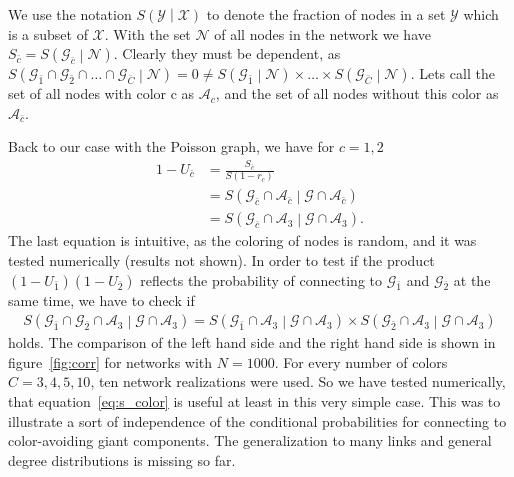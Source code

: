 \documentclass[aps, pre, onecolumn, a4paper, floatfix]{revtex4}
\begin{document}
We use the notation $S\left({\mathcal Y}\middle|{\mathcal X}\right)$ to denote 
the fraction of nodes in a set ${\mathcal Y}$ which is a subset of ${\mathcal X}$. With 
the set ${\mathcal N}$ of all nodes in the network we have 
$S_{\bar c}=S\left({\mathcal G}_{\bar c}\middle|{\mathcal N}\right)$. Clearly they must 
be dependent, as 
$S\left({\mathcal G}_{\bar 1}\cap {\mathcal G}_{\bar 2}\cap \dots 
\cap {\mathcal G}_{\bar C}\middle| {\mathcal N}\right)=0\neq 
S\left({\mathcal G}_{\bar 1}\middle| {\mathcal N}\right)\times\dots \times 
S\left({\mathcal G}_{\bar C}\middle| {\mathcal N}\right)$. 
Lets call the set of all nodes with color c as ${\mathcal A}_c$, 
and the set of all nodes without this color as ${\mathcal A}_{\bar c}$. 

Back to our case with the Poisson graph, we have for $c=1,2$
\begin{align}
1-U_{\bar c} &=\frac{S_{\bar c}}{S (1-r_c)}\\
 &= S\left({\mathcal G}_{\bar c} \cap {\mathcal A}_{\bar c} \middle| {\mathcal G} \cap {\mathcal A}_{\bar c} \right)\\
 &= S\left({\mathcal G}_{\bar c} \cap {\mathcal A}_{3} \middle| {\mathcal G} \cap {\mathcal A}_{3} \right).
\end{align}
The last equation is intuitive, as the coloring of nodes is random, and it was tested numerically (results not shown). 
In order to test if the product $(1-U_{\bar 1})(1-U_{\bar 2})$ reflects the probability of 
connecting to ${\mathcal G}_{\bar 1}$ and ${\mathcal G}_{\bar 2}$ at the same time, 
we have to check if 
\begin{align}
S\left({\mathcal G}_{\bar 1}\cap {\mathcal G}_{\bar 2} \cap {\mathcal A}_3 \middle| {\mathcal G} \cap {\mathcal A}_3 \right)=
S\left({\mathcal G}_{\bar 1} \cap {\mathcal A}_3 \middle| {\mathcal G} \cap {\mathcal A}_3 \right)\times 
S\left({\mathcal G}_{\bar 2} \cap {\mathcal A}_3 \middle| {\mathcal G} \cap {\mathcal A}_3 \right)\label{eq:independent}
\end{align}
holds. The comparison of the left hand side and the right hand side 
is shown in figure~\ref{fig:corr} for networks with $N=1000$. For every number of colors $C=3,4,5,10$, 
ten network realizations were used. So we have tested numerically, that 
equation~\ref{eq:s_color} is useful at least in this very simple case. This was 
to illustrate a sort of independence of the conditional probabilities for connecting 
to color-avoiding giant components. The generalization to many links and 
general degree distributions is missing so far. 
\end{document}
